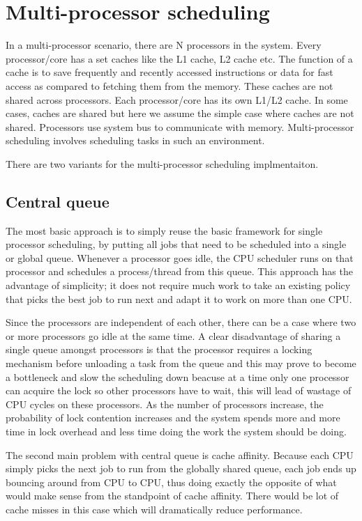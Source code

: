 \documentclass[twoside]{article}
\begin{document}
\section{Multi-processor scheduling}
In a multi-processor scenario, there are N processors in the system. Every processor/core has a set caches like the L1 cache, L2 cache etc. The function of a cache is to save frequently and recently accessed instructions or data for fast access as compared to fetching them from the memory. These caches are not shared across processors. Each processor/core has its own L1/L2 cache. In some cases, caches are shared but here we assume the simple case where caches are not shared. Processors use system bus to communicate with memory. Multi-processor scheduling involves scheduling tasks in such an environment.  

There are two variants for the multi-processor scheduling implmentaiton.

\subsection{Central queue}
 The most basic approach is to simply
reuse the basic framework for single processor scheduling, by putting all
jobs that need to be scheduled into a single or global queue. Whenever a processor goes idle, the CPU scheduler runs on that processor and schedules a process/thread from this queue. This approach has the advantage of simplicity; it does not require much work to take an
existing policy that picks the best job to run next and adapt it to work on
more than one CPU. 

Since the processors are independent of each other, there can be a case where two or more processors go idle at the same time. A clear disadvantage of sharing a single queue amongst processors is that the processor requires a locking mechanism before unloading a task from the queue and this may prove to become a bottleneck and slow the scheduling down beacuse at a time only one processor can acquire the lock so other processors have to wait, this will lead of wastage of CPU cycles on these processors. As the number of processors increase, the probability of lock contention increases and the system spends more and more time in lock overhead and less time doing the work the system should be doing. 

The second main problem with central queue is cache affinity. Because each CPU simply picks the next job to run from the globally shared
queue, each job ends up bouncing around from CPU to CPU, thus
doing exactly the opposite of what would make sense from the standpoint
of cache affinity. There would be lot of cache misses in this case which will dramatically reduce performance.
\end{document}
